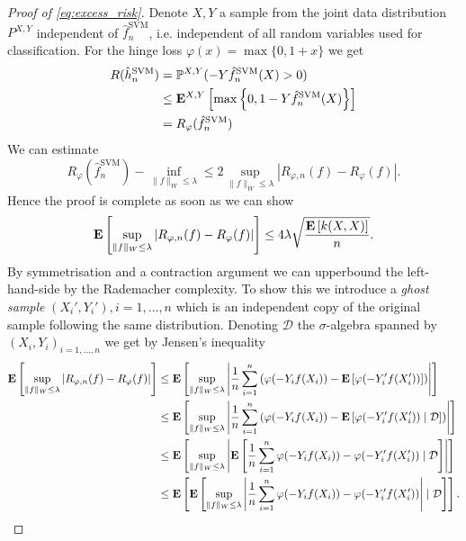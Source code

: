 \begin{proof}[Proof of \autoref{eq:excess_risk}]
Denote $X, Y$ a sample from the joint data distribution $P^{X, Y}$ independent of $\hat{f}_n^\mathrm{SVM}$, i.e. independent of all random variables used for classification. For the hinge loss $\varphi(x) = \max\{0, 1 + x\}$ we get
\begin{align*}
	R(\hat{h}_n^\mathrm{SVM}) &= \mathbb{P}^{X, Y}(-Y\hat{f}_n^\mathrm{SVM}(X) > 0) \\ 
	&\leq \mathbf{E}^{X, Y}\left[\max\left\{0, 1- Y\hat{f}_n^\mathrm{SVM}(X) \right\} \right] \\
	& = R_\varphi(\hat{f}_n^\mathrm{SVM})
\end{align*}
We can estimate
\begin{equation*}
	R_\varphi(\hat{f}_n^\mathrm{SVM}) - \inf_{\|f\|_W \leq \lambda} \leq 2 \sup_{\|f\|_W\leq \lambda} \left|R_{\varphi,n}(f) - R_\varphi(f)\right|.
\end{equation*}
Hence the proof is complete as soon as we can show 
\begin{equation*}
	\mathbf{E}\left[\sup_{\|f\|_W\leq \lambda} \left|R_{\varphi,n}(f) - R_\varphi(f)\right|\right] \leq 4\lambda \sqrt{\frac{\mathbf{E}\left[k(X, X)\right]}{n}}.
\end{equation*}
By symmetrisation and a contraction argument we can upperbound the left-hand-side by the Rademacher complexity. To show this we introduce a \emph{ghost sample} $(X_i', Y_i'), i=1, \ldots,n$ which is an independent copy of the original sample following the same distribution. Denoting $\mathcal{D}$ the $\sigma$-algebra spanned by $(X_i, Y_i)_{i=1, \ldots, n}$ we get by Jensen's inequality 
\begin{align*}
	\E\left[\sup_{\|f\|_W\leq \lambda} \left|R_{\varphi,n}(f) - R_\varphi(f)\right|\right] &\leq \E\left[\sup_{\|f\|_W\leq \lambda} \left|\frac{1}{n}\sum_{i=1}^n\left(\varphi(-Y_if(X_i)) - \E\left[\varphi(-Y_i'f(X_i'))\right]\right)\right|\right] \\
	& \leq \E\left[\sup_{\|f\|_W\leq \lambda} \left|\frac{1}{n}\sum_{i=1}^n\left(\varphi(-Y_if(X_i)) - \E\left[\varphi(-Y_i'f(X_i'))\mid \mathcal{D}\right]\right)\right|\right] \\
	& \leq \E\left[\sup_{\|f\|_W\leq \lambda} \left|\E\left[\frac{1}{n}\sum_{i=1}^n\varphi(-Y_if(X_i)) - \varphi(-Y_i'f(X_i'))\mid \mathcal{D}\right]\right|\right] \\
	& \leq \E\left[\E\left[\sup_{\|f\|_W\leq \lambda} \left|\frac{1}{n}\sum_{i=1}^n\varphi(-Y_if(X_i)) - \varphi(-Y_i'f(X_i'))\right|\mid \mathcal{D}\right]\right].

\end{align*}
\end{proof}
